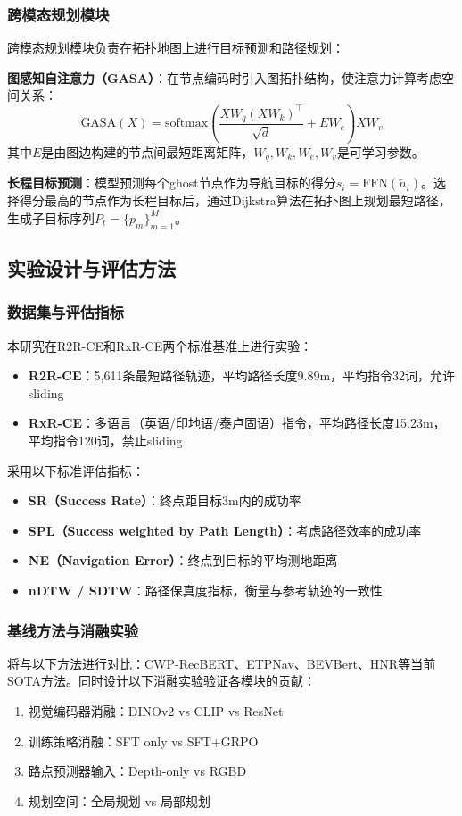 \subsubsection{跨模态规划模块}
跨模态规划模块负责在拓扑地图上进行目标预测和路径规划：

\textbf{图感知自注意力（GASA）}：在节点编码时引入图拓扑结构，使注意力计算考虑空间关系：
\[
\text{GASA}(X) = \text{softmax}\left(\frac{XW_q(XW_k)^\top}{\sqrt{d}} + EW_e\right)XW_v
\]
其中$E$是由图边构建的节点间最短距离矩阵，$W_q, W_k, W_e, W_v$是可学习参数。

\textbf{长程目标预测}：模型预测每个ghost节点作为导航目标的得分$s_i = \text{FFN}(\tilde{n}_i)$。选择得分最高的节点作为长程目标后，通过Dijkstra算法在拓扑图上规划最短路径，生成子目标序列$P_t = \{p_m\}_{m=1}^M$。

\subsection{实验设计与评估方法}
\subsubsection{数据集与评估指标}
本研究在R2R-CE和RxR-CE两个标准基准上进行实验：
\begin{itemize}
    \item \textbf{R2R-CE}：5,611条最短路径轨迹，平均路径长度9.89m，平均指令32词，允许sliding
    \item \textbf{RxR-CE}：多语言（英语/印地语/泰卢固语）指令，平均路径长度15.23m，平均指令120词，禁止sliding
\end{itemize}

采用以下标准评估指标：
\begin{itemize}
    \item \textbf{SR（Success Rate）}：终点距目标3m内的成功率
    \item \textbf{SPL（Success weighted by Path Length）}：考虑路径效率的成功率
    \item \textbf{NE（Navigation Error）}：终点到目标的平均测地距离
    \item \textbf{nDTW / SDTW}：路径保真度指标，衡量与参考轨迹的一致性
\end{itemize}

\subsubsection{基线方法与消融实验}
将与以下方法进行对比：CWP-RecBERT\cite{bridging_gap}、ETPNav\cite{etpnav}、BEVBert、HNR等当前SOTA方法。同时设计以下消融实验验证各模块的贡献：
\begin{enumerate}
    \item 视觉编码器消融：DINOv2 vs CLIP vs ResNet
    \item 训练策略消融：SFT only vs SFT+GRPO
    \item 路点预测器输入：Depth-only vs RGBD
    \item 规划空间：全局规划 vs 局部规划
\end{enumerate}

